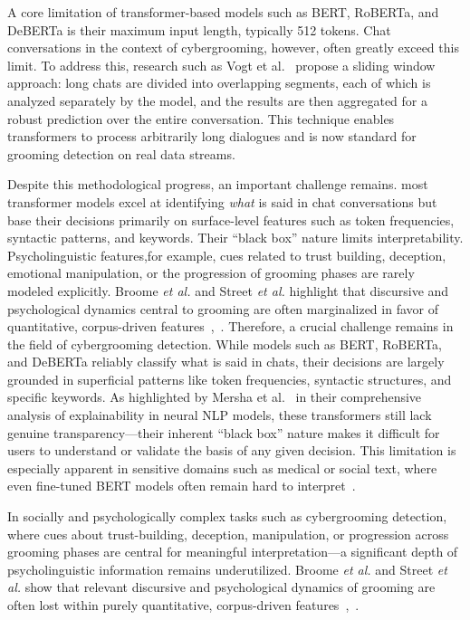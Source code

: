 A core limitation of transformer-based models such as BERT, RoBERTa, and DeBERTa is their maximum input length, typically 512 tokens. Chat conversations in the context of cybergrooming, however, often greatly exceed this limit. To address this, research such as Vogt et al.~\cite{vogt2021early} propose a sliding window approach: long chats are divided into overlapping segments, each of which is analyzed separately by the model, and the results are then aggregated for a robust prediction over the entire conversation. This technique enables transformers to process arbitrarily long dialogues and is now standard for grooming detection on real data streams. %

Despite this methodological progress, an important challenge remains. most transformer models excel at identifying \emph{what} is said in chat conversations but base their decisions primarily on surface-level features such as token frequencies, syntactic patterns, and keywords. Their ``black box'' nature limits interpretability. Psycholinguistic features,for example, cues related to trust building, deception, emotional manipulation, or the progression of grooming phases are rarely modeled explicitly. Broome \textit{et al.} and Street \textit{et al.} highlight that discursive and psychological dynamics central to grooming are often marginalized in favor of quantitative, corpus-driven features~\cite{broome2020psycholinguistic},~\cite{street2024grooming}. %
Therefore, a crucial challenge remains in the field of cybergrooming detection. While models such as BERT, RoBERTa, and DeBERTa reliably classify what is said in chats, their decisions are largely grounded in superficial patterns like token frequencies, syntactic structures, and specific keywords. As highlighted by Mersha et al.~\cite{mersha2025explainabilityneuralnetworksnatural} in their comprehensive analysis of explainability in neural NLP models, these transformers still lack genuine transparency—their inherent “black box” nature makes it difficult for users to understand or validate the basis of any given decision. This limitation is especially apparent in sensitive domains such as medical or social text, where even fine-tuned BERT models often remain hard to interpret~\cite{talebi2024exploring}. %

In socially and psychologically complex tasks such as cybergrooming detection, where cues about trust-building, deception, manipulation, or progression across grooming phases are central for meaningful interpretation—a significant depth of psycholinguistic information remains underutilized. Broome \textit{et al.} and Street \textit{et al.} show that relevant discursive and psychological dynamics of grooming are often lost within purely quantitative, corpus-driven features~\cite{broome2020psycholinguistic},~\cite{street2024grooming}. %

